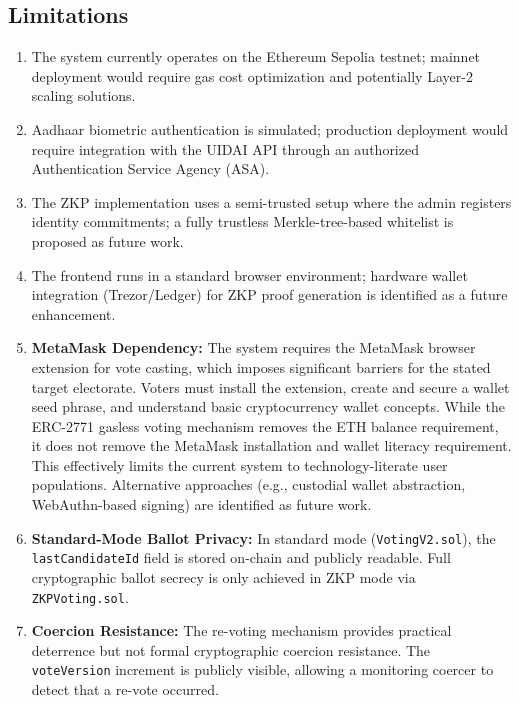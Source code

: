 \documentclass[oneside,a4paper,12pt]{book}
\begin{document}
\subsection{Limitations}
\begin{enumerate}[leftmargin=1.5cm]
    \item The system currently operates on the Ethereum Sepolia testnet; mainnet deployment would require gas cost optimization and potentially Layer-2 scaling solutions.
    \item Aadhaar biometric authentication is simulated; production deployment would require integration with the UIDAI API through an authorized Authentication Service Agency (ASA).
    \item The ZKP implementation uses a semi-trusted setup where the admin registers identity commitments; a fully trustless Merkle-tree-based whitelist is proposed as future work.
    \item The frontend runs in a standard browser environment; hardware wallet integration (Trezor/Ledger) for ZKP proof generation is identified as a future enhancement.
    \item \textbf{MetaMask Dependency:} The system requires the MetaMask browser extension for vote casting, which imposes significant barriers for the stated target electorate. Voters must install the extension, create and secure a wallet seed phrase, and understand basic cryptocurrency wallet concepts. While the ERC-2771 gasless voting mechanism removes the ETH balance requirement, it does not remove the MetaMask installation and wallet literacy requirement. This effectively limits the current system to technology-literate user populations. Alternative approaches (e.g., custodial wallet abstraction, WebAuthn-based signing) are identified as future work.
    \item \textbf{Standard-Mode Ballot Privacy:} In standard mode (\texttt{VotingV2.sol}), the \texttt{lastCandidateId} field is stored on-chain and publicly readable. Full cryptographic ballot secrecy is only achieved in ZKP mode via \texttt{ZKPVoting.sol}.
    \item \textbf{Coercion Resistance:} The re-voting mechanism provides practical deterrence but not formal cryptographic coercion resistance. The \texttt{voteVersion} increment is publicly visible, allowing a monitoring coercer to detect that a re-vote occurred.
\end{enumerate}

\end{document}
